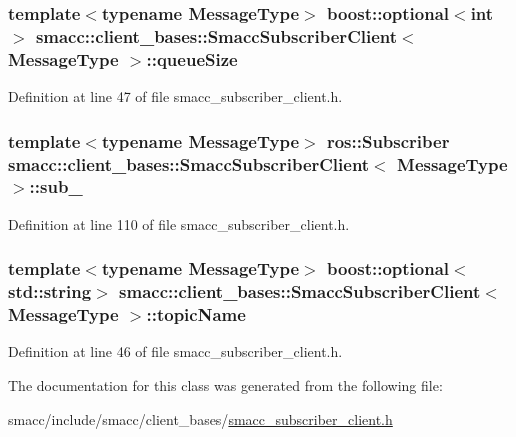\subsubsection[{\texorpdfstring{queue\+Size}{queueSize}}]{\setlength{\rightskip}{0pt plus 5cm}template$<$typename Message\+Type$>$ boost\+::optional$<$int$>$ {\bf smacc\+::client\+\_\+bases\+::\+Smacc\+Subscriber\+Client}$<$ Message\+Type $>$\+::queue\+Size}\hypertarget{classsmacc_1_1client__bases_1_1SmaccSubscriberClient_a67f03f081d83476cdb7fd631b6aba450}{}\label{classsmacc_1_1client__bases_1_1SmaccSubscriberClient_a67f03f081d83476cdb7fd631b6aba450}


Definition at line 47 of file smacc\+\_\+subscriber\+\_\+client.\+h.

\subsubsection[{\texorpdfstring{sub\+\_\+}{sub_}}]{\setlength{\rightskip}{0pt plus 5cm}template$<$typename Message\+Type$>$ ros\+::\+Subscriber {\bf smacc\+::client\+\_\+bases\+::\+Smacc\+Subscriber\+Client}$<$ Message\+Type $>$\+::sub\+\_\+\hspace{0.3cm}{\ttfamily [private]}}\hypertarget{classsmacc_1_1client__bases_1_1SmaccSubscriberClient_a0f69a1b0a284ae47f5d717c6ab95f089}{}\label{classsmacc_1_1client__bases_1_1SmaccSubscriberClient_a0f69a1b0a284ae47f5d717c6ab95f089}


Definition at line 110 of file smacc\+\_\+subscriber\+\_\+client.\+h.

\subsubsection[{\texorpdfstring{topic\+Name}{topicName}}]{\setlength{\rightskip}{0pt plus 5cm}template$<$typename Message\+Type$>$ boost\+::optional$<$std\+::string$>$ {\bf smacc\+::client\+\_\+bases\+::\+Smacc\+Subscriber\+Client}$<$ Message\+Type $>$\+::topic\+Name}\hypertarget{classsmacc_1_1client__bases_1_1SmaccSubscriberClient_aeadf21a09412c6c9488e5acd50fb4f40}{}\label{classsmacc_1_1client__bases_1_1SmaccSubscriberClient_aeadf21a09412c6c9488e5acd50fb4f40}


Definition at line 46 of file smacc\+\_\+subscriber\+\_\+client.\+h.



The documentation for this class was generated from the following file\+:\begin{DoxyCompactItemize}
\item 
smacc/include/smacc/client\+\_\+bases/\hyperlink{smacc__subscriber__client_8h}{smacc\+\_\+subscriber\+\_\+client.\+h}\end{DoxyCompactItemize}

